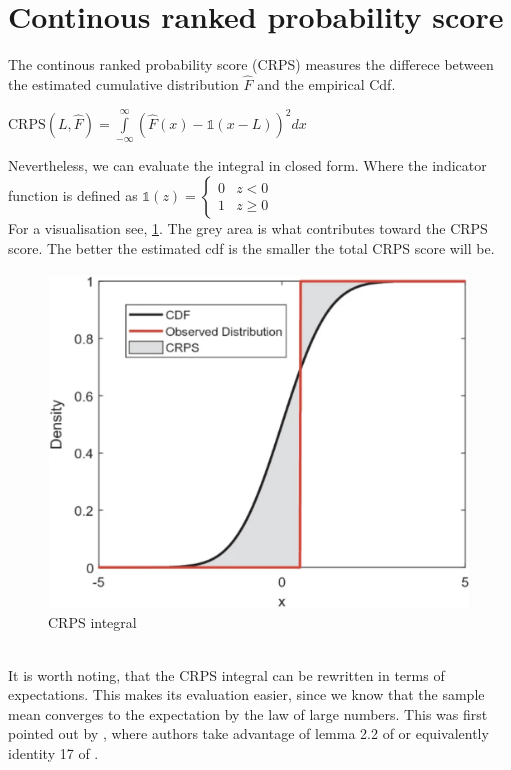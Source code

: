 \section{Continous ranked probability score}
The continous ranked probability score (CRPS) measures the differece between the estimated cumulative distribution $\hat{F}$ and the empirical Cdf.
\begin{definition}\label{def_crps}
    $\mathrm{CRPS}(L, \hat{F})=\int\limits_{-\infty}^{\infty}\left(\hat{F}(x)-\mathbb{1}(x-L) \right)^2 dx$
\end{definition}
Nevertheless, we can evaluate the integral in closed form. 
Where the indicator function is defined as 
    $\mathbb{1}(z)=
\begin{cases}
0 & z<0\\
1 & z \geq 0
\end{cases}$
\\
For a visualisation see, \ref{fig:crps}. The grey area is what contributes toward the CRPS score.
The better the estimated cdf is the smaller the total CRPS score will be.
\begin{figure}
    \includegraphics[width=\textwidth]{images/crps.png}
    \caption{CRPS integral \cite{haben2023core}}
    \label{fig:crps}
  \end{figure}
  \\
It is worth noting, that the CRPS integral can be rewritten in terms of expectations. This makes its evaluation easier, since we know that the sample mean converges to the expectation by the law of large numbers. This was first pointed out by \cite{proper_scores}, where authors take advantage of lemma 2.2 of \cite{new_multi_test2} or equivalently identity 17 of \cite{new_multi_tes1}.
